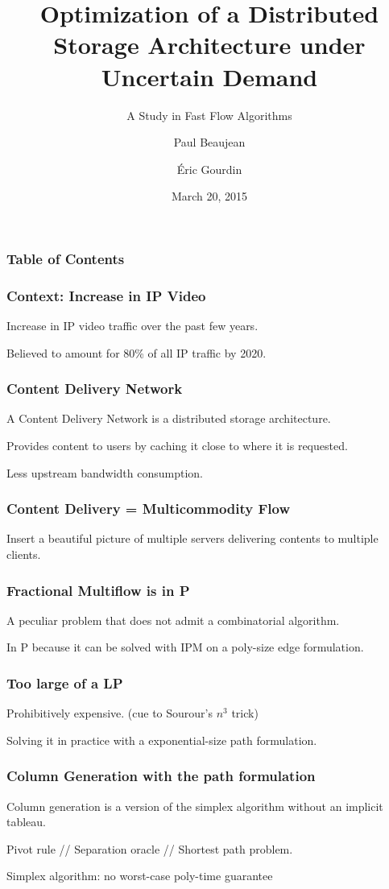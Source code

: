 \documentclass{beamer}
\title{Optimization of a Distributed Storage Architecture under Uncertain
Demand}
\subtitle{A Study in Fast Flow Algorithms}
\date{March 20, 2015}
\author{Paul Beaujean\inst{*}\inst{\dag} \and \'Eric Gourdin\inst{\dag}}
\institute{\inst{*}ENSIIE-MPRO \and \inst{\dag}Orange Labs}
\begin{document}
\frame{\titlepage}

\begin{frame}
    \frametitle{Table of Contents}
    \tableofcontents{}
\end{frame}

\begin{frame}
    \frametitle{Context: Increase in IP Video}

    Increase in IP video traffic over the past few years.

    Believed to amount for 80\% of all IP traffic by 2020.

\end{frame}

\begin{frame}
    \frametitle{Content Delivery Network}

    A Content Delivery Network is a distributed storage architecture.

    Provides content to users by caching it close to where it is requested.

    Less upstream bandwidth consumption.
\end{frame}

\begin{frame}
    \frametitle{Content Delivery = Multicommodity Flow}

    Insert a beautiful picture of multiple servers delivering contents to
    multiple clients.

\end{frame}

\begin{frame}
    \frametitle{Fractional Multiflow is in P}
    
    A peculiar problem that does not admit a combinatorial algorithm.

    In P because it can be solved with IPM on a poly-size edge formulation.


\end{frame}

\begin{frame}
    \frametitle{Too large of a LP}

    Prohibitively expensive. (cue to Sourour's $n^3$ trick)

    Solving it in practice with a exponential-size path formulation.
\end{frame}

\begin{frame}
    \frametitle{Column Generation with the path formulation}
    
    Column generation is a version of the simplex algorithm without an implicit 
    tableau.
    
    Pivot rule // Separation oracle // Shortest path problem.

    Simplex algorithm: no worst-case poly-time guarantee

\end{frame}
\end{document}

